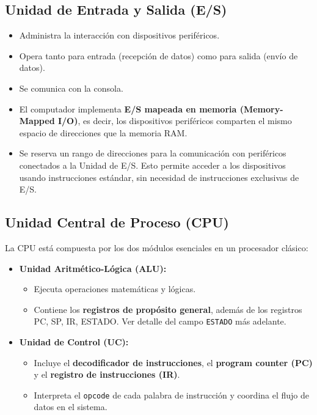 \documentclass{article}
\begin{document}
\subsection{Unidad de Entrada y Salida (E/S)}

\begin{itemize}
  \item Administra la interacción con dispositivos periféricos.
  \item Opera tanto para entrada (recepción de datos) como para salida (envío de datos).
  \item Se comunica con la consola.
  \item El computador implementa \textbf{E/S mapeada en memoria (Memory-Mapped I/O)}, es decir, los dispositivos periféricos comparten el mismo espacio de direcciones que la memoria RAM.
  \item Se reserva un rango de direcciones para la comunicación con periféricos conectados a la Unidad de E/S. Esto permite acceder a los dispositivos usando instrucciones estándar, sin necesidad de instrucciones exclusivas de E/S.
\end{itemize}



\subsection{Unidad Central de Proceso (CPU)}

La CPU está compuesta por los dos módulos esenciales en un procesador clásico:

\begin{itemize}
  \item \textbf{Unidad Aritmético-Lógica (ALU):}
        \begin{itemize}
          \item Ejecuta operaciones matemáticas y lógicas.
          \item Contiene los \textbf{registros de propósito general}, además de los registros PC, SP, IR, ESTADO. Ver detalle del campo \texttt{ESTADO} más adelante.
        \end{itemize}
  \item \textbf{Unidad de Control (UC):}
        \begin{itemize}
          \item Incluye el \textbf{decodificador de instrucciones}, el \textbf{program counter (PC)} y el \textbf{registro de instrucciones (IR)}.
          \item Interpreta el \texttt{opcode} de cada palabra de instrucción y coordina el flujo de datos en el sistema.
        \end{itemize}
\end{itemize}
\end{document}
